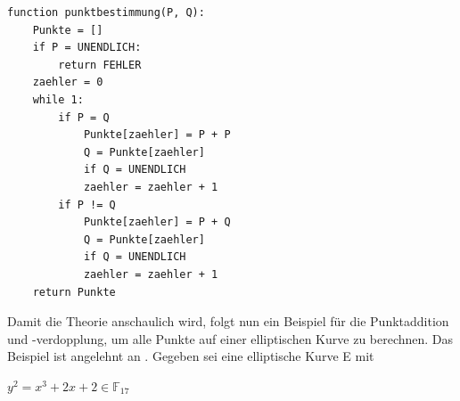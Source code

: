 \begin{lstlisting}[caption={Punktberechnung in Python}, captionpos=b]
function punktbestimmung(P, Q):
	Punkte = []	
	if P = UNENDLICH:
		return FEHLER		
	zaehler = 0
	while 1:
		if P = Q
			Punkte[zaehler] = P + P
			Q = Punkte[zaehler]
			if Q = UNENDLICH
			zaehler = zaehler + 1	
		if P != Q
			Punkte[zaehler] = P + Q
			Q = Punkte[zaehler]
			if Q = UNENDLICH
			zaehler = zaehler + 1
	return Punkte
\end{lstlisting}

Damit die Theorie anschaulich wird, folgt nun ein Beispiel für die Punktaddition und -verdopplung, um alle Punkte auf einer elliptischen Kurve zu berechnen. Das Beispiel ist angelehnt an \cite[S. 279-280]{Paar.2016}. Gegeben sei eine elliptische Kurve E mit
\begin{center}
$y^{2} =  x^{3} + 2x + 2 \in \mathbb{F}_{17}$
\end{center}

